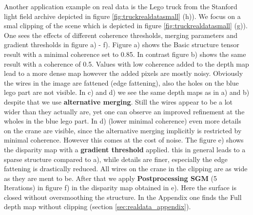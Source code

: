 \documentclass  [
  paper    = a4,
  BCOR     = 10mm,
  twoside,
  fontsize = 12pt,
  fleqn,
  toc      = bibnumbered,
  toc      = listofnumbered,
  numbers  = noendperiod,
  headings = normal,
  listof   = leveldown,
  version  = 3.03
]                                       {scrreprt}
\begin{document}
Another application example on real data is the Lego truck from the Stanford light field archive depicted in figure \ref{fig:truckrealdatasmall} (h)). We focus on a smal clipping of the scene which is depicted in figure \ref{fig:truckrealdatasmall} (g)). One sees the effects of different coherence thresholds, merging parameters and gradient thresholds in figure a) - f). Figure a) shows the Basic structure tensor result with a minimal coherence set to 0.85. In contrast figure b) shows the same result with a coherence of 0.5. Values with low coherence added to the depth map lead to a more dense map however the added pixels are mostly noisy. Obviously the wires in the image are fattened (edge fattening), also the holes on the blue lego part are not visible. In c) and d) we see the same depth maps as in a) and b) despite that we use \textbf{alternative merging}. Still the wires appear to be a lot wider than they actually are, yet one can observe an improved refinement at the wholes in the blue lego part. In d) (lower minimal coherence) even more details on the crane are visible, since the alternative merging implicitly is restricted by minimal coherence. However this comes at the cost of noise. The figure e) shows the disparity map with a \textbf{gradient threshold} applied. this in general leads to a sparse structure compared to a), while details are finer, especially the edge fattening is drastically reduced. All wires on the crane in the clipping are as wide as they are ment to be. After that we  apply \textbf{Postprocessing SGM} (5 Iterations) in figure f) in the disparity map obtained in e). Here the surface is closed without oversmoothing the structure. In the Appendix one finds the Full depth map without clipping (section \ref{sec:realdata_appendix}).
\end{document}
